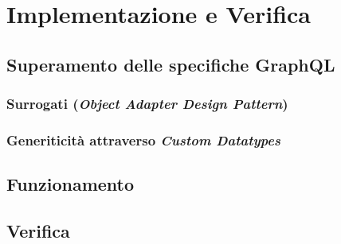 \chapter{Implementazione e Verifica}\label{chap:implementation}

\section{Superamento delle specifiche GraphQL}\label{sec:overcoming-gql-specs}

\subsection{Surrogati (\textit{Object Adapter Design Pattern})}\label{ssec:surrogates}

\subsection{Generiticità attraverso \textit{Custom Datatypes}}\label{ssec:custom-dtypes}

\section{Funzionamento}\label{sec:functioning}

\section{Verifica}\label{sec:testing}

